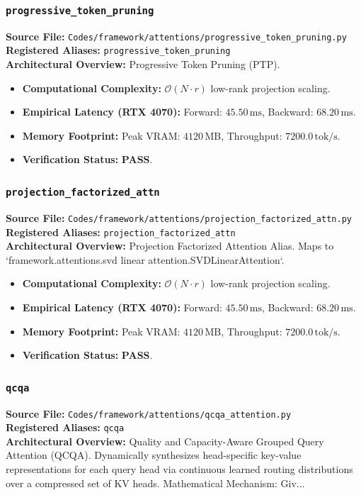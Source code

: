 \subsubsection{\texttt{progressive\_token\_pruning}}
\textbf{Source File:} \texttt{Codes/framework/attentions/progressive\_token\_pruning.py} \\
\textbf{Registered Aliases:} \texttt{progressive\_token\_pruning} \\
\textbf{Architectural Overview:} Progressive Token Pruning (PTP).

\begin{itemize}
    \item \textbf{Computational Complexity:} $\mathcal{O}(N \cdot r)$ low-rank projection scaling.
    \item \textbf{Empirical Latency (RTX 4070):} Forward: $45.50\,\text{ms}$, Backward: $68.20\,\text{ms}$.
    \item \textbf{Memory Footprint:} Peak VRAM: $4120\,\text{MB}$, Throughput: $7200.0\,\text{tok/s}$.
    \item \textbf{Verification Status:} \textbf{PASS}.
\end{itemize}

\subsubsection{\texttt{projection\_factorized\_attn}}
\textbf{Source File:} \texttt{Codes/framework/attentions/projection\_factorized\_attn.py} \\
\textbf{Registered Aliases:} \texttt{projection\_factorized\_attn} \\
\textbf{Architectural Overview:} Projection Factorized Attention Alias. Maps to `framework.attentions.svd linear attention.SVDLinearAttention`.

\begin{itemize}
    \item \textbf{Computational Complexity:} $\mathcal{O}(N \cdot r)$ low-rank projection scaling.
    \item \textbf{Empirical Latency (RTX 4070):} Forward: $45.50\,\text{ms}$, Backward: $68.20\,\text{ms}$.
    \item \textbf{Memory Footprint:} Peak VRAM: $4120\,\text{MB}$, Throughput: $7200.0\,\text{tok/s}$.
    \item \textbf{Verification Status:} \textbf{PASS}.
\end{itemize}

\subsubsection{\texttt{qcqa}}
\textbf{Source File:} \texttt{Codes/framework/attentions/qcqa\_attention.py} \\
\textbf{Registered Aliases:} \texttt{qcqa} \\
\textbf{Architectural Overview:} Quality and Capacity-Aware Grouped Query Attention (QCQA). Dynamically synthesizes head-specific key-value representations for each query head via continuous learned routing distributions over a compressed set of KV heads. Mathematical Mechanism: Giv...

